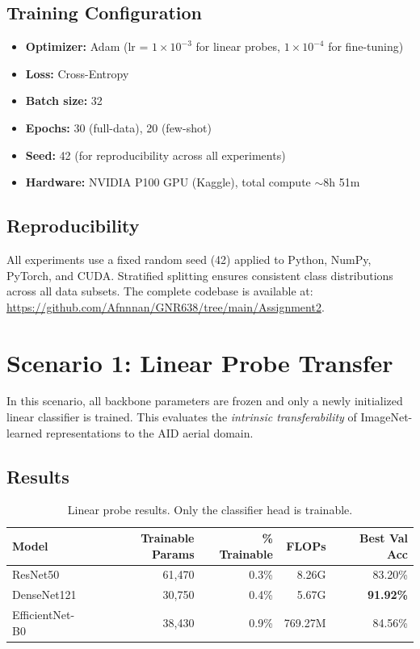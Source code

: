 \documentclass[11pt, a4paper]{article}
\begin{document}
\subsection{Training Configuration}
\begin{itemize}[nosep]
    \item \textbf{Optimizer:} Adam (lr = $1 \times 10^{-3}$ for linear probes, $1 \times 10^{-4}$ for fine-tuning)
    \item \textbf{Loss:} Cross-Entropy
    \item \textbf{Batch size:} 32
    \item \textbf{Epochs:} 30 (full-data), 20 (few-shot)
    \item \textbf{Seed:} 42 (for reproducibility across all experiments)
    \item \textbf{Hardware:} NVIDIA P100 GPU (Kaggle), total compute $\sim$8h 51m
\end{itemize}

\subsection{Reproducibility}
All experiments use a fixed random seed (42) applied to Python, NumPy, PyTorch, and CUDA. Stratified splitting ensures consistent class distributions across all data subsets. The complete codebase is available at: \url{https://github.com/Afnnnan/GNR638/tree/main/Assignment2}.


\section{Scenario 1: Linear Probe Transfer}

In this scenario, all backbone parameters are frozen and only a newly initialized linear classifier is trained. This evaluates the \emph{intrinsic transferability} of ImageNet-learned representations to the AID aerial domain.

\subsection{Results}

\begin{table}[H]
\centering
\caption{Linear probe results. Only the classifier head is trainable.}
\label{tab:s1}
\begin{tabular}{lrrrr}
\toprule
\textbf{Model} & \textbf{Trainable Params} & \textbf{\% Trainable} & \textbf{FLOPs} & \textbf{Best Val Acc} \\
\midrule
ResNet50 & 61,470 & 0.3\% & 8.26G & 83.20\% \\
DenseNet121 & 30,750 & 0.4\% & 5.67G & \textbf{91.92\%} \\
EfficientNet-B0 & 38,430 & 0.9\% & 769.27M & 84.56\% \\
\bottomrule
\end{tabular}
\end{table}
\end{document}
